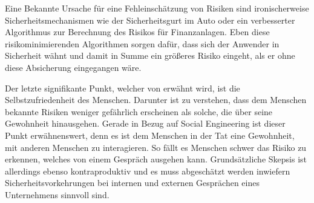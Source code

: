 Eine Bekannte Ursache für eine Fehleinschätzung von Risiken sind ironischerweise
Sicherheitsmechanismen wie der Sicherheitsgurt im Auto oder ein verbesserter Algorithmus zur
Berechnung des Risikos für Finanzanlagen.
Eben diese risikominimierenden Algorithmen sorgen dafür, dass sich der Anwender in Sicherheit wähnt
und damit in Summe ein größeres Risiko eingeht, als er ohne diese Absicherung eingegangen wäre.

Der letzte signifikante Punkt, welcher von \citep{risikomanagement} erwähnt wird, ist die Selbstzufriedenheit des Menschen. Darunter ist zu verstehen,
dass dem Menschen bekannte Risiken weniger gefährlich erscheinen als solche, die über seine Gewohnheit
hinausgehen.
Gerade in Bezug auf Social Engineering ist dieser Punkt erwähnenswert, denn es ist dem Menschen in der
Tat eine Gewohnheit, mit anderen Menschen zu interagieren.
So fällt es Menschen schwer das Risiko zu erkennen, welches von einem Gespräch ausgehen kann.
Grundsätzliche Skepsis ist allerdings ebenso kontraproduktiv und es muss abgeschätzt werden
inwiefern Sicherheitsvorkehrungen bei internen und externen Gesprächen eines Unternehmens sinnvoll
sind.


